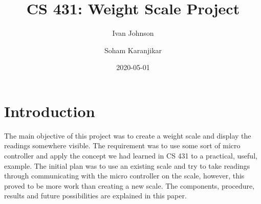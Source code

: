 \documentclass[10pt]{article}
\title{CS 431: Weight Scale Project}
\author{Ivan Johnson \and Soham Karanjikar}
\date{2020-05-01}
\begin{document}
\maketitle


{\newpage \Large\section{Introduction}\par}
{\large The main objective of this project was to create a weight scale and display the readings somewhere visible. The requirement was to use some sort of micro controller and apply the concept we had learned in CS 431 to a practical, useful, example. The initial plan was to use an existing scale and try to take readings through communicating with the micro controller on the scale, however, this proved to be more work than creating a new scale. The components, procedure, results and future possibilities are explained in this paper.
\par}

\vspace{.12 in}

\end{document}
